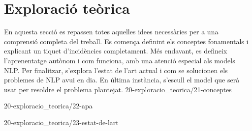 \chapter{Exploració teòrica}
En aquesta secció es repassen totes aquelles idees necessàries per a una comprensió completa del treball. Es comença definint els conceptes fonamentals i explicant un tiquet d'incidències completament. Més endavant, es defineix l'aprenentatge autònom i com funciona, amb una atenció especial als models NLP. Per finalitzar, s'explora l'estat de l'art actual i com se solucionen els problemes de NLP avui en dia. En última instància, s'escull el model que serà usat per resoldre el problema plantejat.
{20-exploracio_teorica/21-conceptes}

{20-exploracio_teorica/22-apa}

{20-exploracio_teorica/23-estat-de-lart}

\begin{comment}
2 Exploració teòrica
2.1 Conceptes generals
    2.1.1 Anàlisi d'un tiquet
    2.1. etc.
2.2 Aprenentatge autònom 
    2.2.1 Models en general
    2.2.2 Models NLP
2.3 Estat de l'art
    2.3.1 Aplicacions comercials
    2.3.2 Propostes descartades
    2.3.3 Comprovació models disponibles
    2.3.4 Models destacats
    2.3.5 Justificació de la tria
\end{comment}